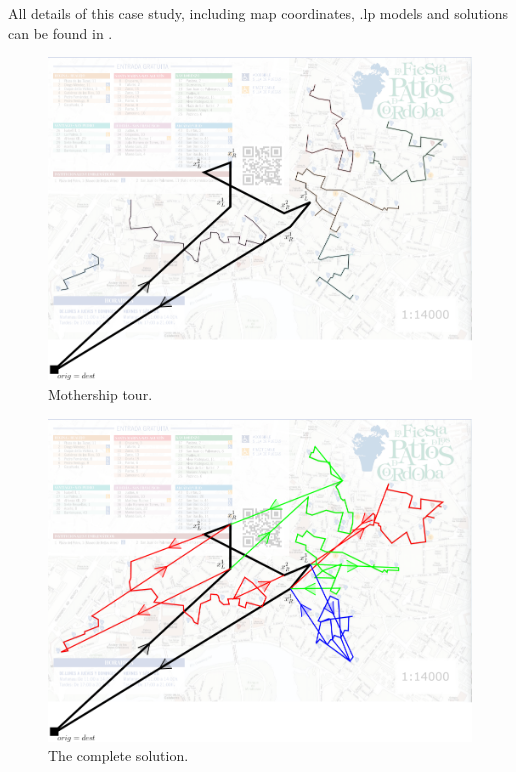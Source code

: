 All details of this case study, including map coordinates, .lp models and solutions can be found in \cite{Puerto2021}.


\begin{figure}[h!]
\centering
\includegraphics[width=0.6\linewidth]{figures/second.png}
\caption{Mothership tour. \label{fig:Mtour}}
\end{figure}

\begin{figure}[h!]
\centering
\includegraphics[width=0.6\linewidth]{figures/third.png}
\caption{The complete solution. \label{fig:tourD}}
\end{figure}